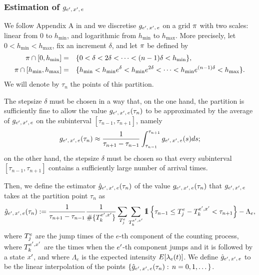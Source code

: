 \documentclass[10pt, article,table]{article}
\begin{document}
\subsubsection{Estimation of $g\subscriptexe$}
We follow Appendix A in \citealp{BJM16est} and we discretise $g\subscriptexe$ on a grid $\partition$ with two scales: linear from $0$ to $h_{\text{min}}$, and logarithmic from $h_{\text{min}}$ to $h_{\text{max}}$. More precisely, let $0<h_{\text{min}}<h_{\text{max}}$, fix an increment $\delta$, and let $\partition$ be defined by 
\begin{equation*}
 \begin{split}
  \partition \cap [0,h_{\text{min}}] =& \quad 
  \lbrace 0<\delta<2\delta< \dots< (n-1)\delta < h_{\text{min}} \rbrace,
  \\
  \partition \cap [h_{\text{min}},h_{\text{max}}] =& \quad 
 \lbrace h_{\text{min}}<h_{\text{min}}e^{\delta}<h_{\text{min}}e^{2\delta}< \dots< h_{\text{min}}e^{(n-1)\delta} < h_{\text{max}} \rbrace.
\end{split}
\end{equation*}
We will denote by $\tau_n$ the points of this partition. 

The stepsize $\delta$ must be chosen in a way that, on  the one hand, the partition is sufficiently fine to allow the value $g\subscriptexe(\tau_n)$  to be approximated by the average of $g\subscriptexe$ on the subinterval $[\tau_{n-1},\tau_{n+1}]$, namely 
\begin{equation*}
 g\subscriptexe (\tau_n) \approx \frac{1}{\tau_{n+1}-\tau_{n-1}} \int_{\tau_{n-1}}^{\tau_{n+1}} g\subscriptexe (s) ds;
\end{equation*}
on the other hand, the stepsize $\delta$ must be chosen so that every subinterval $[\tau_{n-1},\tau_{n+1}]$ contains a sufficiently large number of arrival times.

Then, we define the estimator $\hat{g}\subscriptexe(\tau_n)$ of the value $g\subscriptexe(\tau_n)$ that $g\subscriptexe$ takes at the partition point $\tau_n$ as 
\begin{equation*}
 \hat{g}\subscriptexe(\tau_n)
 :=
 \frac{1}{\tau_{n+1}-\tau_{n-1}}
 \frac{1}{\# \lbrace \arrivalTimes[\eone,\xone]_k\rbrace}
 \sum_{\arrivalTimes[e]_j} \sum_{\arrivalTimes[\eone,\xone]_k}
 \one\left\lbrace \tau_{n-1} \leq \arrivalTimes[e]_j - \arrivalTimes[\eone,\xone]_k < \tau_{n+1} \right\rbrace
 - \Lambda_e,
\end{equation*}
where $\arrivalTimes[e]_j$ are the jump times of the $e$-th component of the counting process,  where $\arrivalTimes[\eone, \xone]_k$ are the times when the $\eone$-th component jumps and it is followed by a state $\xone$, and where $\Lambda_e$ is the expected intensity $\Expectation[\intensity(t)]$.  
We define $\hat{g}\subscriptexe$ to be the linear interpolation of the points $\lbrace \hat{g}\subscriptexe(\tau_n): \, n=0,1,\dots\rbrace$.
\end{document}
